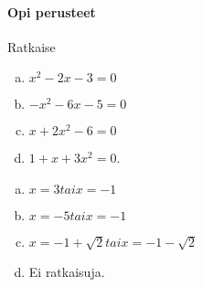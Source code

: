 

\begin{tehtavasivu}

\paragraph*{Opi perusteet}

\begin{tehtava}
    Ratkaise
    \begin{enumerate}[a)]
        \item $x^2 - 2x - 3 = 0$
        \item $-x^2 - 6x - 5 = 0$
        \item $x + 2x^2 - 6= 0$
        \item $1 + x + 3x^2= 0$.
    \end{enumerate}
    \begin{vastaus}
        \begin{enumerate}[a)]
            \item $x = 3 tai x = -1$
            \item $x = -5 tai x = -1$
            \item $x = -1 + \sqrt{2} tai x = -1 - \sqrt{2}$
            \item Ei ratkaisuja.
        \end{enumerate}
    \end{vastaus}
\end{tehtava}


\end{tehtavasivu}
